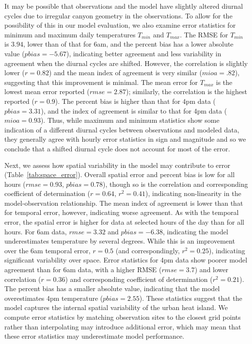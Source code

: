 \documentclass[draft,linenumbers]{agujournal}
\begin{document}
It may be possible that observations and the model have slightly altered diurnal cycles due to irregular canyon geometry in the observations. To allow for the possibility of this in our model evaluation, we also examine error statistics for minimum and maximum daily temperatures $T_{min}$ and $T_{max}$. The RMSE for $T_{min}$ is $3.94$, lower than of that for 6am, and the percent bias has a lower absolute value ($pbias=-5.67$), indicating better agreement and less variability in agreement when the diurnal cycles are shifted. However, the correlation is slightly lower ($r=0.82$) and the mean index of agreement is very similar ($mioa=.82$), suggesting that this improvement is minimal. The mean error for $T_{max}$ is the lowest mean error reported ($rmse=2.87$); similarly, the correlation is the highest reported ($r=0.9$). The percent bias is higher than that for 4pm data ($pbias=3.31$), and the index of agreement is similar to that for 4pm data ($mioa=0.93$).
Thus, while maximum and minimum statistics show some indication of a different diurnal cycles between observations and modeled data, they generally agree with hourly error statistics in sign and magnitude and so we conclude that a shifted diurnal cycle does not account for most of the error.

Next, we 
assess how spatial variability in the model may contribute to error (Table~\ref{tab:space_error}). Overall spatial error and percent bias is low for all hours ($rmse=0.93$, $pbias=0.78$), though so is the correlation and corresponding coefficient of determination ($r=0.64$, $r^2=0.41$), indicating non-linearity in the model-observation relationship. 
The mean index of agreement is lower than that for temporal error, however, indicating worse agreement. 
As with the temporal error, the spatial error is higher for data at selected hours of the day than for all hours. For 6am data, $rmse=3.32$ and $pbias=-6.38$, indicating the model underestimates temperature by several degrees. While this is an improvement over the 6am temporal error, $r=0.5$ (and correspondingly, $r^2 = 0.25$), indicating significant variability over space. Error statistics for 4pm data show poorer model agreement than for 6am data, with a higher RMSE ($rmse = 3.7$) and lower correlation ($r=0.36$) and corresponding coefficient of determination ($r^2 = 0.21$). The percent bias has a smaller absolute value, indicating that the model overestimates 4pm temperature ($pbias=2.55$). 
These statistics suggest that the model captures the internal spatial variability of the urban heat island.  We compute error statistics by matching observation sites to the closest grid points rather than interpolating may introduce additional error, which may mean that these error statistics may underestimate model performance.
\end{document}
